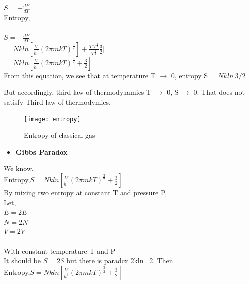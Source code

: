 \documentclass{article}
\newcommand*{\1}{\hspace{1pt}}
\begin{document}
$S=-\frac{dF}{dT}$\\

Entropy,\\ 
\\
$S=-\frac{dF}{dT}$\\

     $=Nkln[\frac{V}{h^3}(2\pi mkT)^{\frac{3}{2}}]+\frac{T.T^{\frac{1}{2}}}{T^{\frac{3}{2}}}\frac{3}{2}]$\\
     
     $=Nkln[\frac{V}{h^3}(2\pi mkT)^{\frac{3}{2}}+\frac{3}{2}]$\\

     From this equation, we see that at temperature T $\rightarrow$ 0, entropy S = $Nkln \ 3/2$ 

     But accordingly, third law of thermodynamics T $\rightarrow$ 0, S  $\rightarrow$ 0. That does not satisfy Third law of thermodymics.
     
     \begin{figure}
    \centering
    \texttt{[image: entropy]}
    \caption{Entropy of classical gas}
    \label{fig:my_label}
\end{figure}

     \begin{itemize}
    \item \textbf{Gibbs Paradox} \cite{l9}
\end{itemize}

We know,\\


Entropy,$S =Nkln[\frac{V}{h^3}(2\pi mkT)^{\frac{3}{2}}+\frac{3}{2}]$\\
    


By mixing two entropy at constant T and pressure P,\\

Let,\\

$E=2E$\\

$N=2N$\\

$V=2V$\\
\\
With constant temperature T and P\\
It should be $S = 2S$ but there is paradox 2kln \ 2.
Then\\

Entropy,$S=Nkln[\frac{V}{h^3}(2\pi mkT)^{\frac{3}{2}}+\frac{3}{2}]$\\
\end{document}
